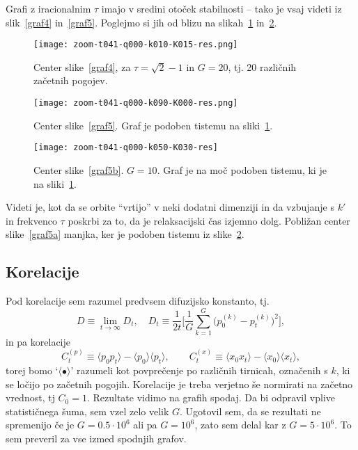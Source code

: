 \documentclass[a4paper, 12pt]{article}
\begin{document}
Grafi z iracionalnim $\tau$ imajo v sredini oto\v cek stabilnosti -- tako je vsaj videti iz slik~\ref{graf4} in~\ref{graf5}.
Poglejmo si jih od blizu na slikah~\ref{graf6} in~\ref{graf7}.
\begin{figure}[H]\centering
	\texttt{[image: zoom-t041-q000-k010-K015-res.png]}
	\caption{Center slike~\ref{graf4}, za $\tau = \sqrt{2} - 1$ in $G = 20$, tj. 20 razli\v cnih za\v cetnih pogojev.}
	\label{graf6}
\end{figure}
\begin{figure}[H]\centering
	\texttt{[image: zoom-t041-q000-k090-K000-res.png]}
	\caption{Center slike~\ref{graf5}. Graf je podoben tistemu na sliki~\ref{graf6}.}
	\label{graf7}
\end{figure}
\begin{figure}[H]\centering
	\texttt{[image: zoom-t041-q000-k050-K030-res]}
	\caption{Center slike~\ref{graf5b}. $G = 10$. Graf je na mo\v c podoben tistemu, ki je na sliki~\ref{graf6}.}
	\label{graf8}
\end{figure}
Videti je, kot da se orbite "`vrtijo"' v neki dodatni dimenziji in da vzbujanje s $k'$ in frekvenco $\tau$ poskrbi za to,
da je relaksacijski \v cas izjemno dolg. Pobli\v zan center slike~\ref{graf5a} manjka, ker je podoben tistemu iz
slike~\ref{graf7}.

\subsection{Korelacije}

Pod korelacije sem razumel predvsem difuzijsko konstanto, tj.
\begin{equation}
	D \equiv \lim_{t \to \infty} D_t, \quad D_t \equiv \frac{1}{2t}\bigg[ \frac{1}{G}\sum_{k = 1}^G \big(p_0^{(k)} -
		p_t^{(k)}\big)^2\bigg],
\end{equation}
in pa korelacije
\begin{equation}
	C_t^{(p)} \equiv \langle p_0 p_t \rangle - \langle p_0 \rangle\langle p_t\rangle,
	\qquad C_t^{(x)} \equiv \langle x_0 x_t \rangle - \langle x_0 \rangle\langle x_t \rangle,
\end{equation}
torej bomo `$\langle \bullet \rangle$' razumeli kot povpre\v cenje po razli\v cnih tirnicah, ozna\v cenih s $k$, ki se
lo\v cijo po za\v cetnih pogojih. Korelacije je treba verjetno \v se normirati na za\v cetno vrednost, tj $C_0 = 1$.
Rezultate vidimo na grafih spodaj. Da bi odpravil vplive statisti\v cnega \v suma, sem vzel zelo velik $G$. Ugotovil sem,
da se rezultati ne spremenijo \v ce je $G = 0.5 \cdot 10^6$ ali pa $G = 10^6$, zato sem delal kar z $G = 5 \cdot 10^6$. To
sem preveril za vse izmed spodnjih grafov.
\end{document}
